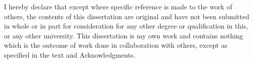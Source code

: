 
\begin{declaration}

I hereby declare that except where specific reference is made to the work of others, the contents of this dissertation are original and have not been submitted in whole or in part for consideration for any other degree or qualification in this, or any other university. This dissertation is my own work and contains nothing which is the outcome of work done in collaboration with others, except as specified in the text and Acknowledgments.



\end{declaration}

